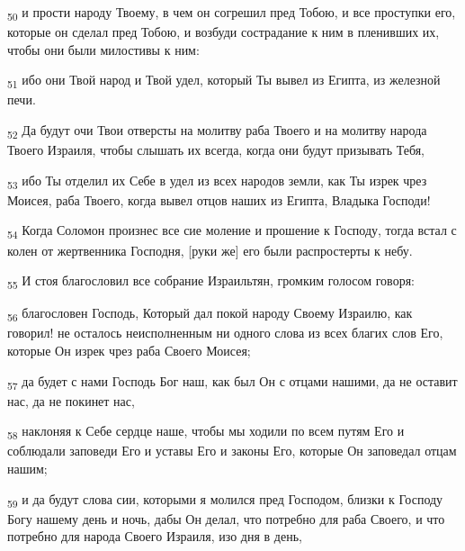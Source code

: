 \begin{tcolorbox}
\textsubscript{50} и прости народу Твоему, в чем он согрешил пред Тобою, и все проступки его, которые он сделал пред Тобою, и возбуди сострадание к ним в пленивших их, чтобы они были милостивы к ним:
\end{tcolorbox}
\begin{tcolorbox}
\textsubscript{51} ибо они Твой народ и Твой удел, который Ты вывел из Египта, из железной печи.
\end{tcolorbox}
\begin{tcolorbox}
\textsubscript{52} Да будут очи Твои отверсты на молитву раба Твоего и на молитву народа Твоего Израиля, чтобы слышать их всегда, когда они будут призывать Тебя,
\end{tcolorbox}
\begin{tcolorbox}
\textsubscript{53} ибо Ты отделил их Себе в удел из всех народов земли, как Ты изрек чрез Моисея, раба Твоего, когда вывел отцов наших из Египта, Владыка Господи!
\end{tcolorbox}
\begin{tcolorbox}
\textsubscript{54} Когда Соломон произнес все сие моление и прошение к Господу, тогда встал с колен от жертвенника Господня, [руки же] его были распростерты к небу.
\end{tcolorbox}
\begin{tcolorbox}
\textsubscript{55} И стоя благословил все собрание Израильтян, громким голосом говоря:
\end{tcolorbox}
\begin{tcolorbox}
\textsubscript{56} благословен Господь, Который дал покой народу Своему Израилю, как говорил! не осталось неисполненным ни одного слова из всех благих слов Его, которые Он изрек чрез раба Своего Моисея;
\end{tcolorbox}
\begin{tcolorbox}
\textsubscript{57} да будет с нами Господь Бог наш, как был Он с отцами нашими, да не оставит нас, да не покинет нас,
\end{tcolorbox}
\begin{tcolorbox}
\textsubscript{58} наклоняя к Себе сердце наше, чтобы мы ходили по всем путям Его и соблюдали заповеди Его и уставы Его и законы Его, которые Он заповедал отцам нашим;
\end{tcolorbox}
\begin{tcolorbox}
\textsubscript{59} и да будут слова сии, которыми я молился пред Господом, близки к Господу Богу нашему день и ночь, дабы Он делал, что потребно для раба Своего, и что потребно для народа Своего Израиля, изо дня в день,
\end{tcolorbox}
